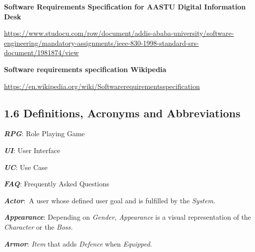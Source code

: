 \documentclass[12pt]{report}
\renewcommand{\_}{\kern-1.5pt\textunderscore\kern-1.5pt}
\begin{document}
\vspace{\baselineskip}
\textbf{Software Requirements Specification for AASTU Digital Information Desk }\par

\href{https://www.studocu.com/row/document/addis-ababa-university/software-engineering/mandatory-assignments/ieee-830-1998-standard-srs-document/1981874/view}{\textcolor[HTML]{1155CC}{\ul{https://www.studocu.com/row/document/addis-ababa-university/software-engineering/mandatory-assignments/ieee-830-1998-standard-srs-document/1981874/view}}}\par


\vspace{\baselineskip}
\textbf{Software requirements specification Wikipedia}\par

\href{https://en.wikipedia.org/wiki/Software_requirements_specification}{\textcolor[HTML]{1155CC}{\ul{https://en.wikipedia.org/wiki/Software\_requirements\_specification}}}\par


\newpage

\vspace{\baselineskip}\subsection*{1.6 Definitions, Acronyms and Abbreviations}
\textbf{\textit{RPG}}: Role Playing Game\par

\textbf{\textit{UI}}: User Interface\par

\textbf{\textit{UC}}: Use Case\par

\textbf{\textit{FAQ}}: Frequently Asked Questions\par


\vspace{\baselineskip}
\textbf{\textit{Actor}}:\ A user whose defined  user goal and is fulfilled by the \textit{System}.\par

\textbf{\textit{Appearance}}: Depending on \textit{Gender,} \textit{Appearance }is a visual representation of the\textit{ Character} or the \textit{Boss.}\par

\textbf{\textit{Armor}}: \textit{Item} that adds \textit{Defence} when \textit{Equipped}.\par
\end{document}
